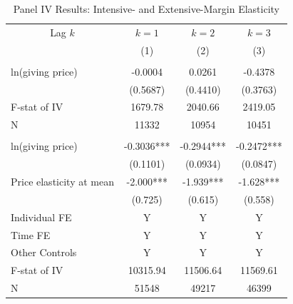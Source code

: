 \documentclass[ review  , 3p ]{elsarticle}
\begin{document}
  \begin{table}
  
  \caption{\label{tab:kablePanelIVEstimateElasticityIntExt}Panel IV Results: Intensive- and Extensive-Margin Elasticity}
  \centering
  \begin{threeparttable}
  \begin{tabular}[t]{lccc}
  \toprule
  \multicolumn{1}{c}{Lag $k$} & \multicolumn{1}{c}{$k = 1$} & \multicolumn{1}{c}{$k = 2$} & \multicolumn{1}{c}{$k = 3$} \\
  \cmidrule(l{3pt}r{3pt}){1-1} \cmidrule(l{3pt}r{3pt}){2-2} \cmidrule(l{3pt}r{3pt}){3-3} \cmidrule(l{3pt}r{3pt}){4-4}
   & (1) & (2) & (3)\\
  \midrule
  \addlinespace[0.3em]
  \multicolumn{4}{l}{\textbf{Intensive Margin}}\\
  \hspace{1em}ln(giving price) & -0.0004 & 0.0261 & -0.4378\\
  \hspace{1em} & (0.5687) & (0.4410) & (0.3763)\\
  \hspace{1em}F-stat of IV & 1679.78 & 2040.66 & 2419.05\\
  \hspace{1em}N & 11332 & 10954 & 10451\\
  \addlinespace[0.3em]
  \multicolumn{4}{l}{\textbf{Extensive Margin}}\\
  \hspace{1em}ln(giving price) & -0.3036*** & -0.2944*** & -0.2472***\\
  \hspace{1em} & (0.1101) & (0.0934) & (0.0847)\\
  \hspace{1em}Price elasticity at mean & -2.000*** & -1.939*** & -1.628***\\
  \hspace{1em} & (0.725) & (0.615) & (0.558)\\
  \hspace{1em}Individual FE & Y & Y & Y\\
  \hspace{1em}Time FE & Y & Y & Y\\
  \hspace{1em}Other Controls & Y & Y & Y\\
  \hspace{1em}F-stat of IV & 10315.94 & 11506.64 & 11569.61\\
  \hspace{1em}N & 51548 & 49217 & 46399\\

\end{tabular}
\end{threeparttable}
\end{table}
\end{document}

